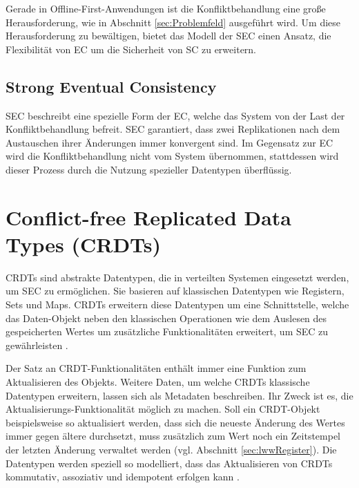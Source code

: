 \documentclass[a4paper, 12pt]{scrreprt}
\begin{document}
Gerade in Offline-First-Anwendungen ist die Konfliktbehandlung eine große Herausforderung, wie in Abschnitt \ref{sec:Problemfeld} ausgeführt wird. Um diese Herausforderung zu bewältigen, bietet das Modell der \acf{SEC} einen Ansatz, die Flexibilität von \ac{EC} um die Sicherheit von \ac{SC} zu erweitern. 




\subsection{Strong Eventual Consistency}


\ac{SEC} beschreibt eine spezielle Form der \acf{EC}, welche das System von der Last der Konfliktbehandlung befreit. \ac{SEC} garantiert, dass zwei Replikationen nach dem Austauschen ihrer Änderungen immer konvergent sind. Im Gegensatz zur \ac{EC} wird die Konfliktbehandlung nicht vom System übernommen, stattdessen wird dieser Prozess durch die Nutzung spezieller Datentypen überflüssig. 


\section{Conflict-free Replicated Data Types (CRDTs)}
\label{sec:CRDTs}

\acp{CRDT} sind abstrakte Datentypen, die in verteilten Systemen eingesetzt werden, um \ac{SEC} zu ermöglichen. Sie basieren auf klassischen Datentypen wie Registern, Sets und Maps. \acp{CRDT} erweitern diese Datentypen um eine Schnittstelle, welche das Daten-Objekt neben den klassischen Operationen wie dem Auslesen des gespeicherten Wertes um zusätzliche Funktionalitäten erweitert, um \ac{SEC} zu gewährleisten \autocite[S.~1]{ArticleCRDTOverview}. 

Der Satz an CRDT-Funktionalitäten enthält immer eine Funktion zum Aktualisieren des Objekts. Weitere Daten, um welche \acp{CRDT} klassische Datentypen erweitern, lassen sich als Metadaten beschreiben. Ihr Zweck ist es, die Aktualisierungs-Funktionalität möglich zu machen. Soll ein CRDT-Objekt beispielsweise so aktualisiert werden, dass sich die neueste Änderung des Wertes immer gegen ältere durchsetzt, muss zusätzlich zum Wert noch ein Zeitstempel der letzten Änderung verwaltet werden (vgl. Abschnitt \ref{sec:lwwRegister}).
Die Datentypen werden speziell so modelliert, dass das Aktualisieren von \acp{CRDT} kommutativ, assoziativ und idempotent erfolgen kann \autocite{InproceedingsCrdtsInProduction}.
\end{document}
